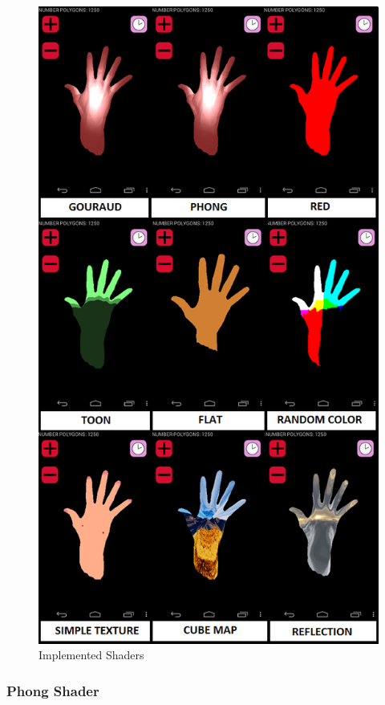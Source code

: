 \documentclass[10pt, conference, compsocconf]{IEEEtran}
\begin{document}
{	\begin{figure}[!t]
	\centering
		\includegraphics[keepaspectratio=true,scale=0.4]{figures/shaders_impl.png}
	\caption{Implemented Shaders}
	\label{shaders_impl}
	\end{figure}

\subsubsection{Phong Shader}

}
\end{document}
